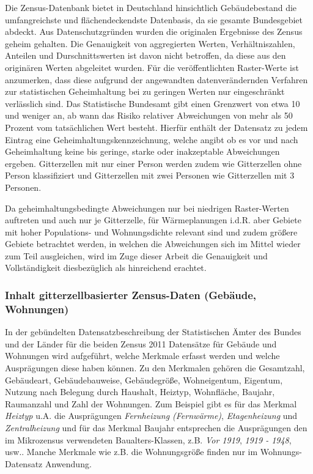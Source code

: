 				Die Zensus-Datenbank bietet in Deutschland hinsichtlich Gebäudebestand die umfangreichste und flächendeckendste Datenbasis, da sie gesamte Bundesgebiet abdeckt. Aus Datenschutzgründen wurden die originalen Ergebnisse des Zensus geheim gehalten. Die Genauigkeit von aggregierten Werten, Verhältniszahlen, Anteilen und Durschnittswerten ist davon nicht betroffen, da diese aus den originären Werten abgeleitet wurden. Für die veröffentlichten Raster-Werte ist anzumerken, dass diese aufgrund der angewandten datenverändernden Verfahren zur statistischen Geheimhaltung bei zu geringen Werten nur eingeschränkt verlässlich sind. Das Statistische Bundesamt gibt einen Grenzwert von etwa 10 und weniger an, ab wann das Risiko relativer Abweichungen von mehr als 50 Prozent vom tatsächlichen Wert besteht. Hierfür enthält der Datensatz zu jedem Eintrag eine Geheimhaltungskennzeichnung, welche angibt ob es vor und nach Geheimhaltung keine bis geringe, starke oder inakzeptable Abweichungen ergeben. Gitterzellen mit nur einer Person werden zudem wie Gitterzellen ohne Person klassifiziert und Gitterzellen mit zwei Personen wie Gitterzellen mit 3 Personen. 
				
				Da geheimhaltungsbedingte Abweichungen nur bei niedrigen Raster-Werten auftreten und auch nur je Gitterzelle, für Wärmeplanungen i.d.R. aber Gebiete mit hoher Populations- und Wohnungsdichte relevant sind und zudem größere Gebiete betrachtet werden, in welchen die Abweichungen sich im Mittel wieder zum Teil ausgleichen, wird im Zuge dieser Arbeit die Genauigkeit und Vollständigkeit diesbezüglich als hinreichend erachtet.
				
		
			\subsubsection{Inhalt gitterzellbasierter Zensus-Daten (Gebäude, Wohnungen)}
			
				In der gebündelten Datensatzbeschreibung der Statistischen Ämter des Bundes und der Länder für die beiden Zensus 2011 Datensätze für Gebäude und Wohnungen wird aufgeführt, welche Merkmale erfasst werden und welche Ausprägungen diese haben können. Zu den Merkmalen gehören die Gesamtzahl, Gebäudeart, Gebäudebauweise, Gebäudegröße, Wohneigentum, Eigentum, Nutzung nach Belegung durch Haushalt, Heiztyp, Wohnfläche, Baujahr, Raumanzahl und Zahl der Wohnungen. Zum Beispiel gibt es für das Merkmal \textit{Heiztyp} u.A. die Ausprägungen \textit{Fernheizung (Fernwärme)}, \textit{Etagenheizung} und \textit{Zentralheizung} und für das Merkmal Baujahr entsprechen die Ausprägungen den im Mikrozensus verwendeten Baualters-Klassen, z.B. \textit{Vor 1919}, \textit{1919 - 1948}, usw.. Manche Merkmale wie z.B. die Wohnungsgröße finden nur im Wohnungs-Datensatz Anwendung.
				
